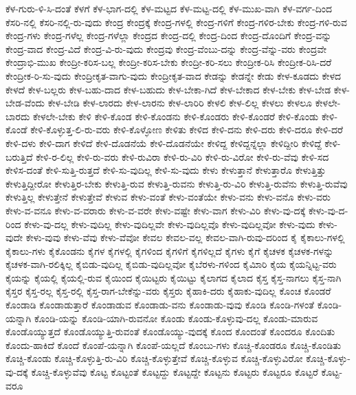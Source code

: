{ಕೆಳ-ಗುರು-ಳಿ-ಸಿ-ದಂತೆ
ಕೆಳಗೆ
ಕೆಳ-ಭಾಗ-ದಲ್ಲಿ
ಕೆಳ-ಮಟ್ಟದ
ಕೆಳ-ಮಟ್ಟ-ದಲ್ಲಿ
ಕೆಳ-ಮುಖ-ವಾಗಿ
ಕೆಳ-ವರ್ಗ-ದಿಂದ
ಕೆಸರಿ-ನಲ್ಲಿ
ಕೆಸರಿ-ನಲ್ಲಿ-ರು-ವುದು
ಕೇಂದ್ರ
ಕೇಂದ್ರಕ್ಕೆ
ಕೇಂದ್ರ-ಗಳಲ್ಲಿ
ಕೇಂದ್ರ-ಗಳಿಗೆ
ಕೇಂದ್ರ-ಗಳಿರ-ಬೇಕು
ಕೇಂದ್ರ-ಗಳಿ-ರುವ
ಕೇಂದ್ರ-ಗಳು
ಕೇಂದ್ರ-ಗಳೆಲ್ಲ
ಕೇಂದ್ರ-ಗಳೆಲ್ಲಾ
ಕೇಂದ್ರದ
ಕೇಂದ್ರ-ದಲ್ಲಿ
ಕೇಂದ್ರ-ದಿಂದ
ಕೇಂದ್ರ-ದೊಂದಿಗೆ
ಕೇಂದ್ರ-ವನ್ನು
ಕೇಂದ್ರ-ವಾದ
ಕೇಂದ್ರ-ವಿದೆ
ಕೇಂದ್ರ-ವಿ-ರು-ವುದು
ಕೇಂದ್ರವು
ಕೇಂದ್ರ-ವೆಂಬು-ದನ್ನು
ಕೇಂದ್ರ-ವೆನ್ನು-ವರು
ಕೇಂದ್ರವೇ
ಕೇಂದ್ರಾಭಿ-ಮುಖ
ಕೇಂದ್ರೀ-ಕರಿಸ-ಬಲ್ಲ
ಕೇಂದ್ರೀ-ಕರಿಸ-ಬೇಕು
ಕೇಂದ್ರೀ-ಕರಿ-ಸಲು
ಕೇಂದ್ರೀಕ-ರಿಸಿ
ಕೇಂದ್ರೀಕ-ರಿಸಿ-ದರೆ
ಕೇಂದ್ರೀಕ-ರಿ-ಸು-ವುದು
ಕೇಂದ್ರೀಕೃತ-ವಾಗು-ವುದು
ಕೇಂದ್ರೀಕೃತ-ವಾದ
ಕೇಡನ್ನು
ಕೇಡನ್ನೇ
ಕೇಡು
ಕೇಳ-ಕೂಡದು
ಕೇಳದ
ಕೇಳದೆ
ಕೇಳ-ಬಲ್ಲರು
ಕೇಳ-ಬಹು-ದಾದ
ಕೇಳ-ಬಹುದು
ಕೇಳ-ಬೇಕಾ-ಗಿದೆ
ಕೇಳ-ಬೇಕಾದ
ಕೇಳ-ಬೇಕು
ಕೇಳ-ಬೇಡ
ಕೇಳ-ಬೇಡ-ವೆಂದು
ಕೇಳ-ಬೇಡಿ
ಕೇಳ-ಲಾರದು
ಕೇಳ-ಲಾರನು
ಕೇಳ-ಲಾರಿರಿ
ಕೇಳಲಿ
ಕೇಳ-ಲಿಲ್ಲ
ಕೇಳಲು
ಕೇಳಲೂ
ಕೇಳಲೇ-ಬಾರದು
ಕೇಳಲೇ-ಬೇಕು
ಕೇಳಿ
ಕೇಳಿ-ಕೊಂಡ
ಕೇಳಿ-ಕೊಂಡನು
ಕೇಳಿ-ಕೊಂಡರು
ಕೇಳಿ-ಕೊಂಡರೆ
ಕೇಳಿ-ಕೊಂಡು
ಕೇಳಿ-ಕೊಂಡೆ
ಕೇಳಿ-ಕೊಳ್ಳುತ್ತ-ಲಿ-ರು-ವರು
ಕೇಳಿ-ಕೊಳ್ಳೋಣ
ಕೇಳಿತು
ಕೇಳಿದ
ಕೇಳಿ-ದನು
ಕೇಳಿ-ದರು
ಕೇಳಿ-ದರೂ
ಕೇಳಿ-ದರೆ
ಕೇಳಿ-ದಳು
ಕೇಳಿ-ದಾಗ
ಕೇಳಿದೆ
ಕೇಳಿ-ದೊಡನೆಯೆ
ಕೇಳಿ-ದೊಡನೆಯೇ
ಕೇಳಿದ್ದ
ಕೇಳಿದ್ದನ್ನೆಲ್ಲಾ
ಕೇಳಿದ್ದೀರಿ
ಕೇಳಿದ್ದೆ
ಕೇಳಿ-ಬರುತ್ತಿದೆ
ಕೇಳಿ-ರ-ಲಿಲ್ಲ
ಕೇಳಿ-ರು-ವರು
ಕೇಳಿ-ರುವಿರಾ
ಕೇಳಿ-ರು-ವಿರಿ
ಕೇಳಿ-ರು-ವಿರೋ
ಕೇಳಿ-ರು-ವೆವು
ಕೇಳಿ-ಸದ
ಕೇಳಿಸ-ದಂತೆ
ಕೇಳಿ-ಸುತ್ತಿ-ರುತ್ತದೆ
ಕೇಳಿ-ಸು-ವುದಿಲ್ಲ
ಕೇಳಿ-ಸು-ವುದು
ಕೇಳು
ಕೇಳುತ್ತಾನೆ
ಕೇಳುತ್ತಾರೊ
ಕೇಳುತ್ತಿತ್ತು
ಕೇಳುತ್ತಿದ್ದೀರೋ
ಕೇಳುತ್ತಿರ-ಬೇಕು
ಕೇಳುತ್ತಿ-ರುವ
ಕೇಳುತ್ತಿ-ರುವನು
ಕೇಳುತ್ತಿ-ರು-ವಿರಿ
ಕೇಳುತ್ತಿ-ರುವೆನು
ಕೇಳುತ್ತಿ-ರುವೆವು
ಕೇಳುತ್ತಿಲ್ಲ
ಕೇಳುತ್ತೇನೆ
ಕೇಳುತ್ತೇವೆ
ಕೇಳುವ
ಕೇಳು-ವಂತೆ
ಕೇಳು-ವಂತೆಯೇ
ಕೇಳು-ವನು
ಕೇಳು-ವನೊ
ಕೇಳು-ವರು
ಕೇಳು-ವ-ವನೂ
ಕೇಳು-ವ-ವರಾರು
ಕೇಳು-ವ-ವರೇ
ಕೇಳು-ವಷ್ಟೇ
ಕೇಳು-ವಾಗ
ಕೇಳು-ವಿರಿ
ಕೇಳು-ವು-ದಕ್ಕೆ
ಕೇಳು-ವು-ದ-ರಿಂದ
ಕೇಳು-ವು-ದಲ್ಲ
ಕೇಳು-ವುದಿಲ್ಲ
ಕೇಳು-ವುದಿಲ್ಲವೇ
ಕೇಳು-ವುದಿಲ್ಲವೊ
ಕೇಳು-ವುದಿಲ್ಲವೋ
ಕೇಳು-ವುದು
ಕೇಳು-ವುದೇ
ಕೇಳು-ವುವು
ಕೇಳು-ವೆವು
ಕೇಳು-ವೆವೋ
ಕೇವಲ
ಕೇವಲ-ವಲ್ಲ
ಕೇವಲ-ವಾಗಿ-ರುವು-ದರಿಂದ
ಕೈ
ಕೈಕಾಲು-ಗಳಲ್ಲಿ
ಕೈಕಾಲು-ಗಳು
ಕೈಕೊಂಡನು
ಕೈಗಳ
ಕೈಗಳಲ್ಲಿ
ಕೈಗಳಿಂದ
ಕೈಗಳಿಗೆ
ಕೈಗಳಿಲ್ಲದೆ
ಕೈಗಳು
ಕೈಗೆ
ಕೈಚಳಕ
ಕೈಚಳಕ-ಗಳನ್ನು
ಕೈಚಳಕ-ವಾಗಿ-ರಲಿಕ್ಕಿಲ್ಲ
ಕೈಬಿಡು-ವುದಿಲ್ಲ
ಕೈಬಿಡು-ವುದಿಲ್ಲವೋ
ಕೈಬೆರಳು-ಗಳಿಂದ
ಕೈಮಿಾರಿ
ಕೈಯ
ಕೈಯನ್ನಿಟ್ಟ-ವರು
ಕೈಯನ್ನು
ಕೈಯಲ್ಲಿ
ಕೈಯಲ್ಲಿ-ರುವ
ಕೈಯಿಂದ
ಕೈಯಿಟ್ಟರು
ಕೈಯಿಟ್ಟು
ಕೈಲಾಗದ
ಕೈಲಾದ
ಕೈಸ್ತ
ಕೈಸ್ತ-ನಾಗಲು
ಕೈಸ್ತ-ನಾಗಿ
ಕೈಸ್ತರ
ಕೈಸ್ತ-ರಲ್ಲ
ಕೈಸ್ತ-ರಲ್ಲಿ
ಕೈಸ್ತ-ರಾಗ-ಬೇಕೆನ್ನು-ವರು
ಕೈಸ್ತರು
ಕೈಹಾಕಿ-ದರು
ಕೈಹಾಕು-ವುದಿಲ್ಲ
ಕೊಂಚ
ಕೊಂಡರೆ
ಕೊಂಡಾಡಿ
ಕೊಂಡಾಡುತ್ತಾರೆ
ಕೊಂಡಾಡುವ
ಕೊಂಡಾಡು-ವನು
ಕೊಂಡಾಡು-ವುವು
ಕೊಂಡಿ
ಕೊಂಡಿ-ಗಳಂತೆ
ಕೊಂಡಿ-ಯನ್ನಾಗಿ
ಕೊಂಡಿ-ಯನ್ನು
ಕೊಂಡಿ-ಯಾಗಿ-ರುವನೋ
ಕೊಂಡು
ಕೊಂಡು-ಕೊಳ್ಳುವು-ದಲ್ಲ
ಕೊಂಡು-ಮಾರುವ
ಕೊಂಡೊಯ್ಯುತ್ತದೆ
ಕೊಂಡೊಯ್ಯುತ್ತಿ-ರುವಂತೆ
ಕೊಂಡೊಯ್ಯು-ವುದಕ್ಕೆ
ಕೊಂದ
ಕೊಂದಂತೆ
ಕೊಂದರೂ
ಕೊಂದಿತು
ಕೊಂದು-ಹಾಕಿದೆ
ಕೊಂದೆ
ಕೊಂಪೆ-ಯನ್ನಾಗಿ
ಕೊಂಪೆ-ಯಲ್ಲದೆ
ಕೊಂಬು-ಗಳು
ಕೊಚ್ಚಿ-ಕೊಂಡರೂ
ಕೊಚ್ಚಿ-ಕೊಂಡಿತು
ಕೊಚ್ಚಿ-ಕೊಂಡು
ಕೊಚ್ಚಿ-ಕೊಳ್ಳುತ್ತಿ-ರು-ವಿರಿ
ಕೊಚ್ಚಿ-ಕೊಳ್ಳುತ್ತೇವೆ
ಕೊಚ್ಚಿ-ಕೊಳ್ಳುವ
ಕೊಚ್ಚಿ-ಕೊಳ್ಳುವಿರೋ
ಕೊಚ್ಚಿ-ಕೊಳ್ಳು-ವು-ದಕ್ಕೆ
ಕೊಚ್ಚಿ-ಕೊಳ್ಳುವೆವು
ಕೊಟ್ಟ
ಕೊಟ್ಟಂತೆ
ಕೊಟ್ಟದ್ದು
ಕೊಟ್ಟದ್ದೇ
ಕೊಟ್ಟನು
ಕೊಟ್ಟರು
ಕೊಟ್ಟರೂ
ಕೊಟ್ಟರೆ
ಕೊಟ್ಟ-ವರೂ
}
